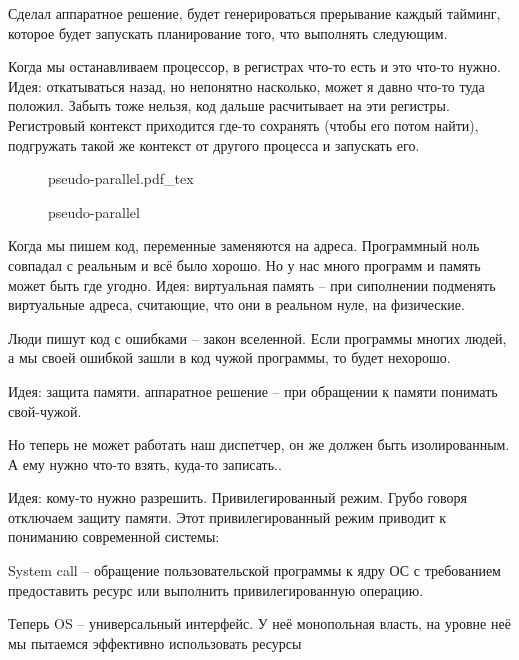 \documentclass{book}
\theoremstyle{definition}
\newcommand{\incfig}[1]{%
    \def\svgwidth{\columnwidth}
    {#1.pdf_tex}
}
\begin{document}
    \begin{problem}

        Сделал аппаратное решение, будет генерироваться прерывание каждый тайминг, которое будет запускать планирование того, что выполнять следующим.

        Когда мы останавливаем процессор, в регистрах что-то есть и это что-то нужно. Идея: откатываться назад, но непонятно насколько, может я давно что-то туда положил. Забыть тоже нельзя, код дальше расчитывает на эти регистры. Регистровый контекст приходится где-то сохранять (чтобы его потом найти), подгружать такой  же контекст от другого процесса и запускать его.
    \end{problem}
\begin{figure}[!ht]
    \centering
    \incfig{pseudo-parallel}
    \caption{pseudo-parallel}
    \label{fig:pseudo-parallel}
\end{figure}
    \begin{problem}

        Когда мы пишем код, переменные заменяются на адреса. Программный ноль совпадал с реальным и всё было хорошо. Но у нас много программ и память может быть где угодно. Идея: виртуальная память -- при сиполнении подменять виртуальные адреса, считающие, что они в реальном нуле, на физические.
    \end{problem}

    \begin{problem}

        Люди пишут код с ошибками -- закон вселенной. Если программы многих людей, а мы своей ошибкой зашли в код чужой программы, то будет нехорошо.

        Идея: защита памяти. аппаратное решение -- при обращении к памяти понимать свой-чужой.

        Но теперь не может работать наш диспетчер, он же должен быть изолированным. А ему нужно что-то взять, куда-то записать..

        Идея: кому-то нужно разрешить. Привилегированный режим. Грубо говоря отключаем защиту памяти. Этот привилегированный режим приводит к пониманию современной системы:

        System call -- обращение пользовательской программы к ядру ОС с требованием предоставить ресурс или выполнить привилегированную операцию.

        Теперь OS -- универсальный интерфейс. У неё монопольная власть, на уровне неё мы пытаемся эффективно использовать ресурсы
    \end{problem}
\end{document}
